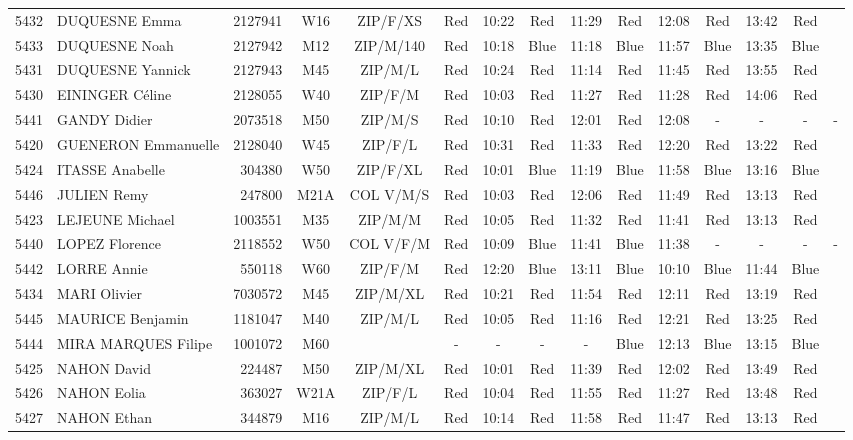 \documentclass{report}
\begin{document}
\begin{longtable}{|c|l|r|c|c|*{5}{cc|}}
    5432 & DUQUESNE Emma & 2127941 & W16 & ZIP/F/XS & Red & 10:22 & Red & 11:29 & Red & 12:08 & Red & 13:42 & Red &  \\
    5433 & DUQUESNE Noah & 2127942 & M12 & ZIP/M/140 & Red & 10:18 & Blue & 11:18 & Blue & 11:57 & Blue & 13:35 & Blue &  \\
    5431 & DUQUESNE Yannick & 2127943 & M45 & ZIP/M/L & Red & 10:24 & Red & 11:14 & Red & 11:45 & Red & 13:55 & Red &  \\
    5430 & EININGER Céline & 2128055 & W40 & ZIP/F/M & Red & 10:03 & Red & 11:27 & Red & 11:28 & Red & 14:06 & Red &  \\
    5441 & GANDY Didier & 2073518 & M50 & ZIP/M/S & Red & 10:10 & Red & 12:01 & Red & 12:08 & - &  - & - &  -\\
    5420 & GUENERON Emmanuelle & 2128040 & W45 & ZIP/F/L & Red & 10:31 & Red & 11:33 & Red & 12:20 & Red & 13:22 & Red &  \\
    5424 & ITASSE Anabelle & 304380 & W50 & ZIP/F/XL & Red & 10:01 & Blue & 11:19 & Blue & 11:58 & Blue & 13:16 & Blue &  \\
    5446 & JULIEN Remy & 247800 & M21A & COL V/M/S & Red & 10:03 & Red & 12:06 & Red & 11:49 & Red & 13:13 & Red &  \\
    5423 & LEJEUNE Michael & 1003551 & M35 & ZIP/M/M & Red & 10:05 & Red & 11:32 & Red & 11:41 & Red & 13:13 & Red &  \\
    5440 & LOPEZ Florence & 2118552 & W50 & COL V/F/M & Red & 10:09 & Blue & 11:41 & Blue & 11:38 & - &  - & - &  -\\
    5442 & LORRE Annie & 550118 & W60 & ZIP/F/M & Red & 12:20 & Blue & 13:11 & Blue & 10:10 & Blue & 11:44 & Blue &  \\
    5434 & MARI Olivier & 7030572 & M45 & ZIP/M/XL & Red & 10:21 & Red & 11:54 & Red & 12:11 & Red & 13:19 & Red &  \\
    5445 & MAURICE Benjamin & 1181047 & M40 & ZIP/M/L & Red & 10:05 & Red & 11:16 & Red & 12:21 & Red & 13:25 & Red &  \\
    5444 & MIRA MARQUES Filipe & 1001072 & M60 &   & - &  - & - &  - & Blue & 12:13 & Blue & 13:15 & Blue &  \\
    5425 & NAHON David & 224487 & M50 & ZIP/M/XL & Red & 10:01 & Red & 11:39 & Red & 12:02 & Red & 13:49 & Red &  \\
    5426 & NAHON Eolia & 363027 & W21A & ZIP/F/L & Red & 10:04 & Red & 11:55 & Red & 11:27 & Red & 13:48 & Red &  \\
    5427 & NAHON Ethan & 344879 & M16 & ZIP/M/L & Red & 10:14 & Red & 11:58 & Red & 11:47 & Red & 13:13 & Red &  \\

\end{longtable}
\end{document}
